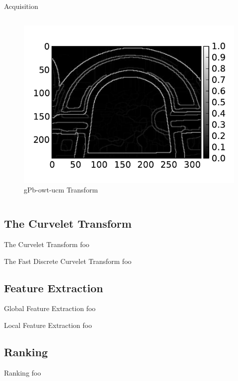 \documentclass{beamer}
\begin{document}
\begin{frame}{Acquisition}
\begin{columns}
\begin{column}{0.25\textwidth}
            \begin{figure}
                \includegraphics[width=\textwidth]{illustrations/input_example_segment}
                \caption{gPb-owt-ucm Transform}
            \end{figure}
        \end{column}
    \end{columns}
\end{frame}

\subsection{The Curvelet Transform}
\begin{frame}{The Curvelet Transform}
    foo
\end{frame}

\begin{frame}{The Fast Discrete Curvelet Transform}
    foo
\end{frame}

\subsection{Feature Extraction}
\begin{frame}{Global Feature Extraction}
    foo
\end{frame}

\begin{frame}{Local Feature Extraction}
    foo
\end{frame}

\subsection{Ranking}
\begin{frame}{Ranking}
    foo
\end{frame}
\end{document}
